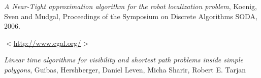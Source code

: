 \documentclass[a4paper,10pt]{article}
\begin{document}
\newpage
\begin{thebibliography}{1}
 \emph{A Near-Tight approximation algorithm for the robot localization problem},
 Koenig, Sven and Mudgal, Proceedings of the Symposium on Discrete Algorithms SODA, 2006.

 $<$\url{http://www.cgal.org/}$>$

 \emph{Linear time algorithms for visibility and shortest path problems inside simple polygons}, Guibas, 
Hershberger, Daniel Leven, Micha Sharir, Robert E. Tarjan
\end{thebibliography}
\end{document}
